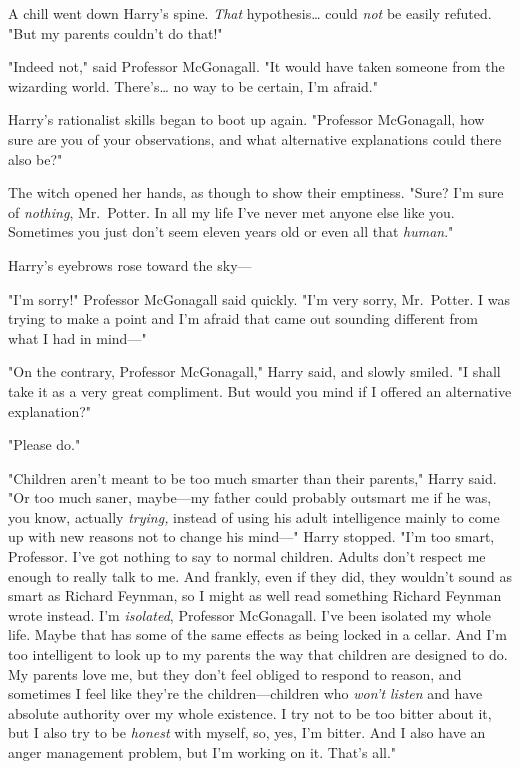 A chill went down Harry's spine. \emph{That} hypothesis{\ldots} could 
\emph{not} be easily refuted. "But my parents couldn't do that!"

"Indeed not," said Professor McGonagall. "It would have taken someone from the 
wizarding world. There's{\ldots} no way to be certain, I'm afraid."

Harry's rationalist skills began to boot up again. "Professor McGonagall, how 
sure are you of your observations, and what alternative explanations could 
there also be?"

The witch opened her hands, as though to show their emptiness. "Sure? I'm sure 
of \emph{nothing}, Mr.~Potter. In all my life I've never met anyone else like 
you. Sometimes you just don't seem eleven years old or even all that 
\emph{human}."

Harry's eyebrows rose toward the sky---

"I'm sorry!" Professor McGonagall said quickly. "I'm very sorry, Mr.~Potter. I 
was trying to make a point and I'm afraid that came out sounding different from 
what I had in mind---"

"On the contrary, Professor McGonagall," Harry said, and slowly smiled. "I 
shall take it as a very great compliment. But would you mind if I offered an 
alternative explanation?"

"Please do."

"Children aren't meant to be too much smarter than their parents," Harry said. 
"Or too much saner, maybe---my father could probably outsmart me if he was, you 
know, actually \emph{trying,} instead of using his adult intelligence mainly to 
come up with new reasons not to change his mind---" Harry stopped. "I'm too 
smart, Professor. I've got nothing to say to normal children. Adults don't 
respect me enough to really talk to me. And frankly, even if they did, they 
wouldn't sound as smart as Richard Feynman, so I might as well read something 
Richard Feynman wrote instead. I'm \emph{isolated}, Professor McGonagall. I've 
been isolated my whole life. Maybe that has some of the same effects as being 
locked in a cellar. And I'm too intelligent to look up to my parents the way 
that children are designed to do. My parents love me, but they don't feel 
obliged to respond to reason, and sometimes I feel like they're the 
children---children who \emph{won't listen} and have absolute authority over my 
whole existence. I try not to be too bitter about it, but I also try to be 
\emph{honest} with myself, so, yes, I'm bitter. And I also have an anger 
management problem, but I'm working on it. That's all."

